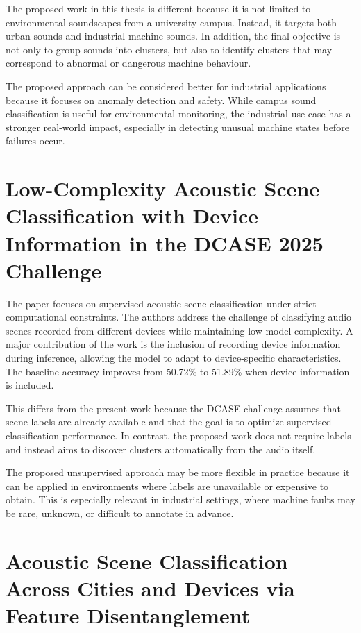 \documentclass[runningheads,a4paper,11pt]{report}
\begin{document}
The proposed work in this thesis is different because it is not limited to environmental soundscapes from a university campus. Instead, it targets both urban sounds and industrial machine sounds. In addition, the final objective is not only to group sounds into clusters, but also to identify clusters that may correspond to abnormal or dangerous machine behaviour.

The proposed approach can be considered better for industrial applications because it focuses on anomaly detection and safety. While campus sound classification is useful for environmental monitoring, the industrial use case has a stronger real-world impact, especially in detecting unusual machine states before failures occur.

\section{Low-Complexity Acoustic Scene Classification with Device Information in the DCASE 2025 Challenge}

The paper \cite{lowcomplexityacousticsceneclassification} focuses on supervised acoustic scene classification under strict computational constraints. The authors address the challenge of classifying audio scenes recorded from different devices while maintaining low model complexity. A major contribution of the work is the inclusion of recording device information during inference, allowing the model to adapt to device-specific characteristics. The baseline accuracy improves from 50.72\% to 51.89\% when device information is included.

This differs from the present work because the DCASE challenge assumes that scene labels are already available and that the goal is to optimize supervised classification performance. In contrast, the proposed work does not require labels and instead aims to discover clusters automatically from the audio itself.

The proposed unsupervised approach may be more flexible in practice because it can be applied in environments where labels are unavailable or expensive to obtain. This is especially relevant in industrial settings, where machine faults may be rare, unknown, or difficult to annotate in advance.

\section{Acoustic Scene Classification Across Cities and Devices via Feature Disentanglement}
\end{document}
